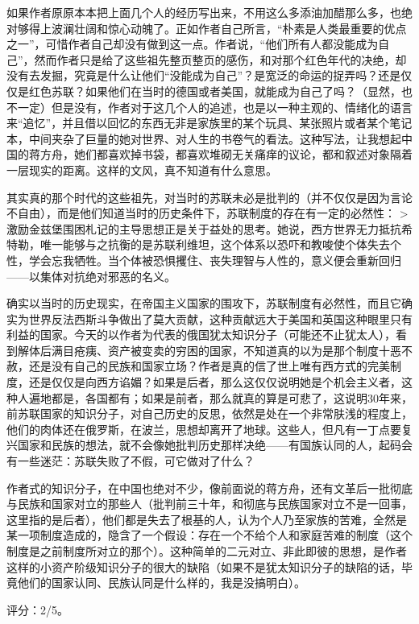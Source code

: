 如果作者原原本本把上面几个人的经历写出来，不用这么多添油加醋那么多，也绝对够得上波澜壮阔和惊心动魄了。正如作者自己所言，“朴素是人类最重要的优点之一”，可惜作者自己却没有做到这一点。作者说，“他们所有人都没能成为自己”，然而作者只是给了这些祖先整页整页的感伤，和对那个红色年代的决绝，却没有去发掘，究竟是什么让他们“没能成为自己”？是宽泛的命运的捉弄吗？还是仅仅是红色苏联？如果他们在当时的德国或者美国，就能成为自己了吗？（显然，也不一定）但是没有，作者对于这几个人的追述，也是以一种主观的、情绪化的语言来“追忆”，并且借以回忆的东西无非是家族里的某个玩具、某张照片或者某个笔记本，中间夹杂了巨量的她对世界、对人生的书卷气的看法。这种写法，让我想起中国的蒋方舟，她们都喜欢掉书袋，都喜欢堆砌无关痛痒的议论，都和叙述对象隔着一层现实的距离。这样的文风，真不知道有什么意思。

其实真的那个时代的这些祖先，对当时的苏联未必是批判的（并不仅仅是因为言论不自由），而是他们知道当时的历史条件下，苏联制度的存在有一定的必然性：
> 激励金兹堡围困札记的主导思想正是关于益处的思考。她说，西方世界无力抵抗希特勒，唯一能够与之抗衡的是苏联利维坦，这个体系以恐吓和教唆使个体失去个性，学会忘我牺牲。当个体被恐惧攫住、丧失理智与人性的，意义便会重新回归——以集体对抗绝对邪恶的名义。

确实以当时的历史现实，在帝国主义国家的围攻下，苏联制度有必然性，而且它确实为世界反法西斯斗争做出了莫大贡献，这种贡献远大于美国和英国这种眼里只有利益的国家。今天的以作者为代表的俄国犹太知识分子（可能还不止犹太人），看到解体后满目疮痍、资产被变卖的穷困的国家，不知道真的以为是那个制度十恶不赦，还是没有自己的民族和国家立场？作者是真的信了世上唯有西方式的完美制度，还是仅仅是向西方谄媚？如果是后者，那么这仅仅说明她是个机会主义者，这种人遍地都是，各国都有；如果是前者，那么就真的算是可悲了，这说明30年来，前苏联国家的知识分子，对自己历史的反思，依然是处在一个非常肤浅的程度上，他们的肉体还在俄罗斯，在波兰，思想却离开了地球。这些人，但凡有一丁点要复兴国家和民族的想法，就不会像她批判历史那样决绝——有国族认同的人，起码会有一些迷茫：苏联失败了不假，可它做对了什么？

作者式的知识分子，在中国也绝对不少，像前面说的蒋方舟，还有文革后一批彻底与民族和国家对立的那些人（批判前三十年，和彻底与民族国家对立不是一回事，这里指的是后者），他们都是失去了根基的人，认为个人乃至家族的苦难，全然是某一项制度造成的，隐含了一个假设：存在一个不给个人和家庭苦难的制度（这个制度是之前制度所对立的那个）。这种简单的二元对立、非此即彼的思想，是作者这样的小资产阶级知识分子的很大的缺陷（如果不是犹太知识分子的缺陷的话，毕竟他们的国家认同、民族认同是什么样的，我是没搞明白）。

评分：2/5。